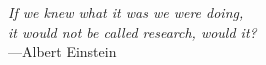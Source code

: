 \clearpage{}

\thispagestyle{empty}
\vphantom{.}
\vfill
{%
    \flushright{}
    \emph{If we knew what it was we were doing,\\
          it would not be called research, would it?}\\
    \hfill---Albert Einstein
}
\vfill
\vfill

